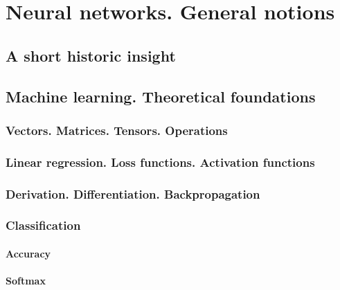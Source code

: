 \chapter{Neural networks. General notions}
\label{chap:ch3}



\section{A short historic insight}
\label{sec:ch3sec1}


\section{Machine learning. Theoretical foundations}
\label{subsec:ch3sec2}


\subsection{Vectors. Matrices. Tensors. Operations}
\label{subsec:ch3sec2subsec1}


\subsection{Linear regression. Loss functions. Activation functions}
\label{subsec:ch3sec2subsec2}

\subsection{Derivation. Differentiation. Backpropagation}
\label{subsec:ch3sec2subsec3}

\subsection{Classification}
\label{subsec:ch3sec2subsec4}

\subsubsection{Accuracy}
\label{subsubsec:ch3sec2subsec4subsubsec1}

\subsubsection{Softmax}
\label{subsubsec:ch3sec2subsec4subsubsec2}

